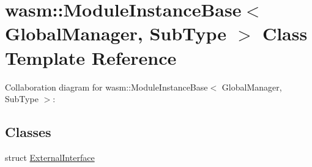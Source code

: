 \hypertarget{classwasm_1_1_module_instance_base}{}\section{wasm\+:\+:Module\+Instance\+Base$<$ Global\+Manager, Sub\+Type $>$ Class Template Reference}
\label{classwasm_1_1_module_instance_base}


Collaboration diagram for wasm\+:\+:Module\+Instance\+Base$<$ Global\+Manager, Sub\+Type $>$\+:
\subsection*{Classes}
\begin{DoxyCompactItemize}
\item 
struct \mbox{\hyperlink{structwasm_1_1_module_instance_base_1_1_external_interface}{External\+Interface}}
\end{DoxyCompactItemize}
